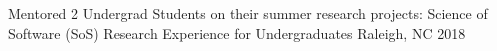 \begin{cventries}
    \cventry
    {Mentored 2 Undergrad Students on their summer research projects:
    }
    {Science of Software (SoS) Research Experience for Undergraduates}
    {Raleigh, NC}
    {2018}
    {
    \begin{cvitems}
    \end{cvitems}
    }
\end{cventries}
